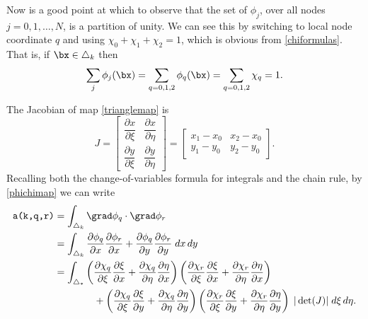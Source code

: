 Now is a good point at which to observe that the set of $\phi_j$, over all nodes $j=0,1,\dots,N$, is a partition of unity.  We can see this by switching to local node coordinate $q$ and using $\chi_0+\chi_1+\chi_2=1$, which is obvious from \eqref{chiformulas}.  That is, if $\bx \in \triangle_k$ then
\begin{equation}
   \sum_j \phi_j(\bx) = \sum_{q=0,1,2} \phi_q(\bx) = \sum_{q=0,1,2} \chi_q =1.  \label{partitionofunity}
\end{equation}

The Jacobian of map \eqref{trianglemap} is
\begin{equation}
J = \begin{bmatrix}
    \dfrac{\partial x}{\partial \xi} & \dfrac{\partial x}{\partial \eta} \\[1.0em]
    \dfrac{\partial y}{\partial \xi} & \dfrac{\partial y}{\partial \eta}
    \end{bmatrix}
    =
    \begin{bmatrix}
    x_1-x_0 & x_2-x_0 \\
    y_1-y_0 & y_2-y_0
    \end{bmatrix}.  \label{trianglejacobian}
\end{equation}
Recalling both the change-of-variables formula for integrals and the chain rule, by \eqref{phichimap} we can write
\begin{align}
\text{\texttt{a(k,q,r)}} &= \int_{\triangle_k} \grad\phi_q \cdot \grad\phi_r \label{elementcontrib} \\
   &= \int_{\triangle_k} \frac{\partial\phi_q}{\partial x} \frac{\partial\phi_r}{\partial x} + \frac{\partial\phi_q}{\partial y} \frac{\partial\phi_r}{\partial y} \; dx \, dy  \notag \\
   &= \int_{\triangle_\ast} \left(\frac{\partial \chi_q}{\partial \xi} \frac{\partial \xi}{\partial x} + \frac{\partial \chi_q}{\partial \eta} \frac{\partial \eta}{\partial x}\right) \left(\frac{\partial \chi_r}{\partial \xi} \frac{\partial \xi}{\partial x} + \frac{\partial \chi_r}{\partial \eta} \frac{\partial \eta}{\partial x}\right) \notag \\
   &\qquad\qquad + \left(\frac{\partial \chi_q}{\partial \xi} \frac{\partial \xi}{\partial y} + \frac{\partial \chi_q}{\partial \eta} \frac{\partial \eta}{\partial y}\right) \left(\frac{\partial \chi_r}{\partial \xi} \frac{\partial \xi}{\partial y} + \frac{\partial \chi_r}{\partial \eta} \frac{\partial \eta}{\partial y}\right) \; |\det(J)| \; d\xi \, d\eta. \notag
\end{align}
